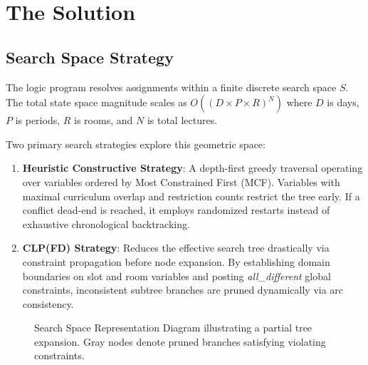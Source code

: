 \documentclass[conference]{IEEEtran}
\begin{document}
\section{The Solution}

\subsection{Search Space Strategy}
The logic program resolves assignments within a finite discrete search space $S$. The total state space magnitude scales as $O((D \times P \times R)^N)$ where $D$ is days, $P$ is periods, $R$ is rooms, and $N$ is total lectures.

Two primary search strategies explore this geometric space:
\begin{enumerate}
    \item \textbf{Heuristic Constructive Strategy}: A depth-first greedy traversal operating over variables ordered by Most Constrained First (MCF). Variables with maximal curriculum overlap and restriction counts restrict the tree early. If a conflict dead-end is reached, it employs randomized restarts instead of exhaustive chronological backtracking.
    \item \textbf{CLP(FD) Strategy}: Reduces the effective search tree drastically via constraint propagation before node expansion. By establishing domain boundaries on slot and room variables and posting \textit{all\_different} global constraints, inconsistent subtree branches are pruned dynamically via arc consistency.
\end{enumerate}

\begin{figure}[htbp]
\centering
{}
\caption{Search Space Representation Diagram illustrating a partial tree expansion. Gray nodes denote pruned branches satisfying violating constraints.}
\label{fig:search_space}
\end{figure}
\end{document}
